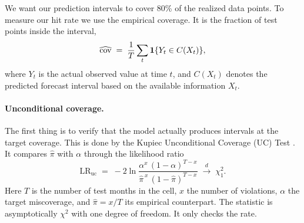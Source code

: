 %
%
We want our prediction intervals to cover 80\% of the realized data points. To measure our hit rate we use the empirical coverage. It is the fraction of test points inside the interval,
\begin{equation}
  \widehat{\mathrm{cov}} \;=\; \frac{1}{T}\sum_{t}
  \mathbf{1}\{Y_t \in C(X_t)\},
  \label{eq:coverage}
\end{equation}
where $Y_t$ is the actual observed value at time $t$, and $C(X_t)$ denotes the predicted forecast interval based on the available information $X_t$. 
\paragraph{Unconditional coverage.}
The first thing is to verify that the model actually produces intervals at the target coverage. This is done by the Kupiec Unconditional Coverage (UC) Test \parencite{kupiec1995}. It compares
$\hat{\pi}$ with $\alpha$ through the likelihood ratio
\begin{equation}
  \mathrm{LR}_{\mathrm{uc}} \;=\;
  -2\ln\!\frac{\alpha^{x}\,(1-\alpha)^{T-x}}
              {\hat{\pi}^{\,x}\,(1-\hat{\pi})^{T-x}}
  \;\xrightarrow{d}\; \chi^2_{1}.
  \label{eq:kupiec}
\end{equation}
Here $T$ is the number of test months in the cell, $x$ the number of
violations, $\alpha$ the target miscoverage, and $\hat{\pi}=x/T$ its empirical
counterpart. The statistic is asymptotically $\chi^2$ with one degree of
freedom. It only checks the rate.
